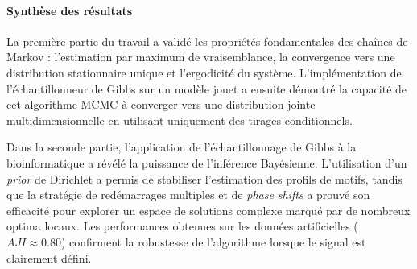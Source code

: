\documentclass[12pt, a4paper]{article}
\begin{document}
\paragraph{Synthèse des résultats}
La première partie du travail a validé les propriétés fondamentales des chaînes de 
Markov : l'estimation par maximum de vraisemblance, la convergence vers une distribution 
stationnaire unique et l'ergodicité du système. L'implémentation de l'échantillonneur de 
Gibbs sur un modèle jouet a ensuite démontré la capacité de cet algorithme MCMC à 
converger vers une distribution jointe multidimensionnelle en utilisant uniquement des 
tirages conditionnels.

Dans la seconde partie, l'application de l'échantillonnage de Gibbs à la 
bioinformatique a révélé la puissance de l'inférence Bayésienne. 
L'utilisation d'un \textit{prior} de Dirichlet a permis de stabiliser l'estimation des 
profils de motifs, tandis que la stratégie de redémarrages multiples et de 
\textit{phase shifts} a prouvé son efficacité pour explorer un espace de solutions 
complexe marqué par de nombreux optima locaux. Les performances obtenues sur les 
données artificielles ($AJI \approx 0.80$) confirment la robustesse de l'algorithme 
lorsque le signal est clairement défini.

\newpage
\appendix
\end{document}
